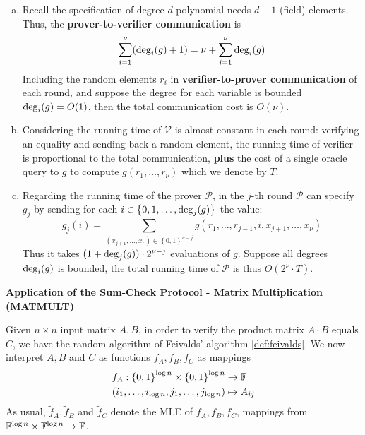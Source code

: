\documentclass{article}
\begin{document}
\begin{enumerate}[(a)]
\item\label{item:11} Recall the specification of degree $d$ polynomial needs $d + 1$ (field) elements. Thus, the \textbf{prover-to-verifier communication} is 
\begin{equation*}
\sum_{i = 1}^{\nu} (\operatorname{deg}_i(g) + 1) = \nu + \sum_{i = 1}^{\nu} \operatorname{deg}_i(g)
\end{equation*}
Including the random elements $r_i$ in \textbf{verifier-to-prover communication} of each round, and suppose the degree for each variable is bounded $\operatorname{deg}_i(g) = O(1)$, then the total communication cost is $O(\nu)$. 
\item\label{item:13} Considering the running time of $\mathcal{V}$ is almost constant in each round: verifying an equality and sending back a random element, the running time of verifier is proportional to the total communication, \textbf{plus} the cost of a single oracle query to $g$ to compute $g(r_1, \dots, r_{\nu})$ which we denote by $T$. 
\item\label{item:15} Regarding the running time of the prover $\mathcal{P}$, in the $j$-th round $\mathcal{P}$ can specify $g_j$ by sending for each $i \in \left\{ 0, 1, \dots, \operatorname{deg}_j(g) \right\}$ the value:
\begin{equation*}
g_j(i) = \sum_{(x_{j+1}, \dots, x_r) \in \left\{ 0, 1 \right\}^{\nu - j}} g(r_1, \dots, r_{j-1}, i, x_{j + 1}, \dots, x_{\nu})
\end{equation*}
Thus it takes $(1 + \operatorname{deg}_j(g)) \cdot 2^{\nu - j}$ evaluations of $g$. Suppose all degrees $\operatorname{deg}_i(g)$ is bounded, the total running time of $\mathcal{P}$ is thus $O(2^{\nu} \cdot T)$.
\end{enumerate}

\textbf{Application of the Sum-Check Protocol - Matrix Multiplication (M{\footnotesize AT}M{\footnotesize ULT})}

Given $n \times n$ input matrix $A, B$, in order to verify the product matrix $A \cdot B$ equals $C$, we have the random algorithm of Feivalds' algorithm \ref{def:feivalds}. We now interpret $A, B$ and $C$ as functions $f_A, f_B, f_C$ as mappings
\begin{equation*}
\begin{split}
& f_A: \left\{ 0, 1 \right\}^{\log n} \times \left\{ 0, 1 \right\}^{\log n} \rightarrow \mathbb{F} \\
 & (i_1, \dots, i_{\log n}, j_1, \dots, j_{\log n}) \mapsto A_{ij}
\end{split}
\end{equation*}
As usual, $\widetilde{f}_A, \widetilde{f}_B$ and $\widetilde{f}_C$ denote the MLE of $f_A, f_B, f_C$, mappings from $\mathbb{F}^{\log n} \times \mathbb{F}^{\log n} \rightarrow \mathbb{F}$. 
\end{document}
